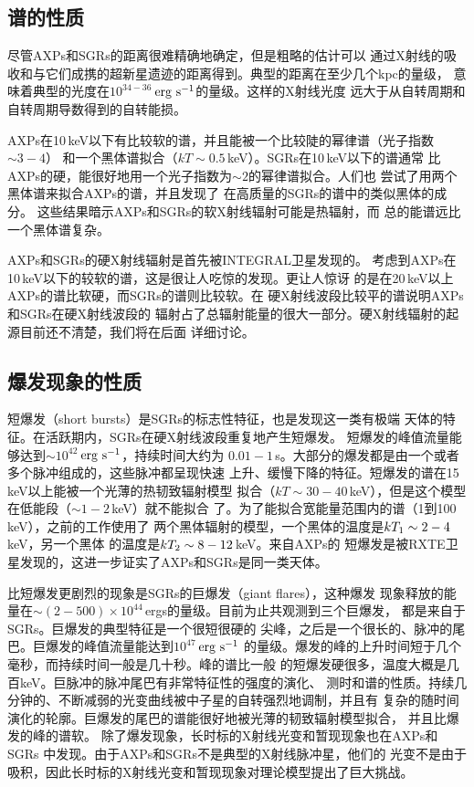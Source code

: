 \subsection{谱的性质}

尽管AXPs和SGRs的距离很难精确地确定，但是粗略的估计可以
通过X射线的吸收和与它们成携的超新星遗迹的距离得到。典型的距离在至少几个kpc的量级，
意味着典型的光度在$10^{34-36}$\,$\rm{erg\ s^{-1}}$的量级。这样的X射线光度
远大于从自转周期和自转周期导数得到的自转能损。

AXPs在10\,keV以下有比较软的谱，并且能被一个比较陡的幂律谱（光子指数$\sim3-4$）
和一个黑体谱拟合（$kT\sim0.5$\,keV）。SGRs在10\,keV以下的谱通常
比AXPs的硬，能很好地用一个光子指数为$\sim2$的幂律谱拟合。人们也
尝试了用两个黑体谱来拟合AXPs的谱\supercite{m08,hg05}，并且发现了
在高质量的SGRs的谱中的类似黑体的成分\supercite{m08,mte+05,met+06}。
这些结果暗示AXPs和SGRs的软X射线辐射可能是热辐射，而
总的能谱远比一个黑体谱复杂\supercite{m08}。

AXPs和SGRs的硬X射线辐射是首先被INTEGRAL卫星发现的\supercite{khm04,dhk+06,mgm+05,gmt+06}。
考虑到AXPs在10\,keV以下的较软的谱，这是很让人吃惊的发现。更让人惊讶
的是在20\,keV以上AXPs的谱比软硬，而SGRs的谱则比较软。在
硬X射线波段比较平的谱说明AXPs和SGRs在硬X射线波段的
辐射占了总辐射能量的很大一部分。硬X射线辐射的起源目前还不清楚，我们将在后面
详细讨论。

\subsection{爆发现象的性质}

短爆发（short bursts）是SGRs的标志性特征，也是发现这一类有极端
天体的特征。在活跃期内，SGRs在硬X射线波段重复地产生短爆发。
短爆发的峰值流量能够达到$\sim10^{42}$\,$\rm{erg\ s^{-1}}$，持续时间大约为
$0.01-1$\,s。大部分的爆发都是由一个或者多个脉冲组成的，这些脉冲都呈现快速
上升、缓慢下降的特征。短爆发的谱在15\,keV以上能被一个光薄的热韧致辐射模型
拟合（$kT\sim30-40$\,keV），但是这个模型在低能段（$\sim1-2$\,keV）就不能拟合
了\supercite{flu94}。为了能拟合宽能量范围内的谱（1到100\,keV），之前的工作使用了
两个黑体辐射的模型，一个黑体的温度是$kT_{\rm{1}}\sim2-4$\,keV，另一个黑体
的温度是$kT_{\rm{2}}\sim8-12$\,keV\supercite{fcm+04}。来自AXPs的
短爆发是被RXTE卫星发现的\supercite{klc00,kgw+03}，这进一步证实了AXPs和SGRs是同一类天体。

比短爆发更剧烈的现象是SGRs的巨爆发（giant flares），这种爆发
现象释放的能量在$\sim(2-500)\times10^{44}$\,ergs的量级。目前为止共观测到三个巨爆发，
都是来自于SGRs\supercite{m08}。巨爆发的典型特征是一个很短很硬的
尖峰，之后是一个很长的、脉冲的尾巴。巨爆发的峰值流量能达到$10^{47}$\,$\rm{erg\ s^{-1}}$
的量级。爆发的峰的上升时间短于几个毫秒，而持续时间一般是几十秒。峰的谱比一般
的短爆发硬很多，温度大概是几百keV。巨脉冲的脉冲尾巴有非常特征性的强度的演化、
测时和谱的性质。持续几分钟的、不断减弱的光变曲线被中子星的自转强烈地调制，并且有
复杂的随时间演化的轮廓。巨爆发的尾巴的谱能很好地被光薄的韧致辐射模型拟合，
并且比爆发的峰的谱软。
%
除了爆发现象，长时标的X射线光变和暂现现象也在AXPs和SGRs
中发现。由于AXPs和SGRs不是典型的X射线脉冲星，他们的
光变不是由于吸积，因此长时标的X射线光变和暂现现象对理论模型提出了巨大挑战。

